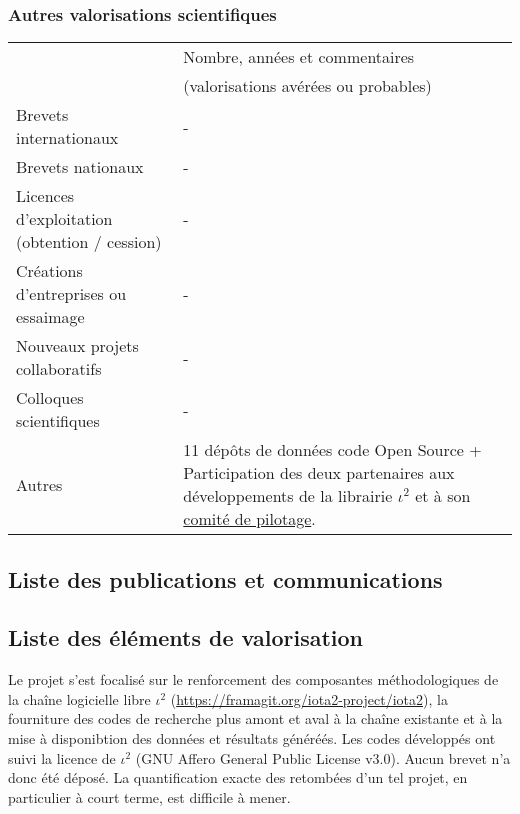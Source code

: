 \subsubsection*{Autres valorisations scientifiques} 
\begin{table}[htbp]
\small
    \centering
    \begin{tabular}{|p{6.8cm}|p{6.7cm}|}
    \hline
& Nombre, années et commentaires \\
&(valorisations avérées ou probables)\\\hline
Brevets internationaux &-\\\hline
Brevets nationaux &- \\\hline
Licences d’exploitation (obtention / cession)&- \\\hline
Créations d’entreprises ou essaimage&- \\\hline
Nouveaux projets collaboratifs & - \\\hline
Colloques scientifiques&- \\\hline
Autres & 11 dépôts de données code Open Source + Participation des deux partenaires aux développements de la librairie $\iota^2$ et à son \href{https://framagit.org/iota2-project/iota2/-/wikis/Project-Steering-Committee}{comité de pilotage}. \\
\hline
    \end{tabular}
    \label{tab:valo_other}
\end{table}


\subsection{Liste des publications et communications}

\printbibliography[keyword={LASTIG-CESBIO-j},title={Journaux}]
\printbibliography[keyword={LASTIG-CESBIO-c},title={Conférences}]

\subsection{Liste des éléments de valorisation}
\label{subsec:valo}
Le projet s'est focalisé sur le renforcement des composantes méthodologiques de la chaîne logicielle libre $\iota^2$ (\href{https://framagit.org/iota2-project/iota2}{https://framagit.org/iota2-project/iota2}), la fourniture des codes de recherche plus amont et aval à la chaîne existante et à la mise à disponibtion des données et résultats généréés. Les codes développés ont suivi la licence de $\iota^2$ (GNU Affero General Public License v3.0). Aucun brevet n'a donc été déposé. La quantification exacte des retombées d'un tel projet, en particulier à court terme, est difficile à mener.

